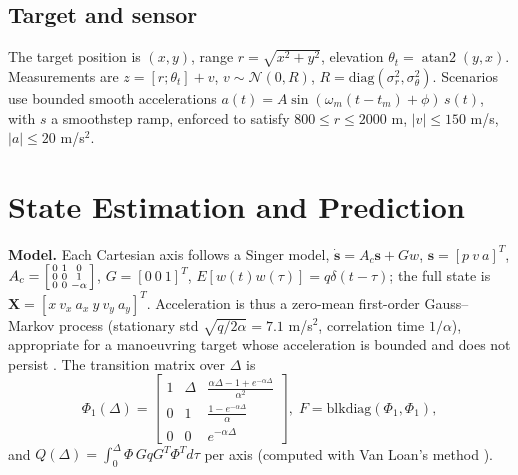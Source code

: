 \documentclass[conference]{IEEEtran}
\begin{document}
\subsection{Target and sensor}
The target position is $(x,y)$, range $r=\sqrt{x^2+y^2}$, elevation $\theta_t=\operatorname{atan2}(y,x)$. Measurements are $z=[r;\theta_t]+v$, $v\sim\mathcal N(0,R)$, $R=\mathrm{diag}(\sigma_r^2,\sigma_\theta^2)$. Scenarios use bounded smooth accelerations $a(t)=A\sin(\omega_m(t-t_m)+\phi)\,s(t)$, with $s$ a smoothstep ramp, enforced to satisfy $800\le r\le2000$ m, $|v|\le150$ m/s, $|a|\le20$ m/s$^2$.

\section{State Estimation and Prediction}
\textbf{Model.} Each Cartesian axis follows a Singer model, $\dot{\mathbf s}=A_c\mathbf s+G w$, $\mathbf s=[p\ v\ a]^T$, $A_c=\begin{bsmallmatrix}0&1&0\\0&0&1\\0&0&-\alpha\end{bsmallmatrix}$, $G=[0\ 0\ 1]^T$, $E[w(t)w(\tau)]=q\delta(t-\tau)$; the full state is $\mathbf X=[x\ v_x\ a_x\ y\ v_y\ a_y]^T$. Acceleration is thus a zero-mean first-order Gauss--Markov process (stationary std $\sqrt{q/2\alpha}=7.1$ m/s$^2$, correlation time $1/\alpha$), appropriate for a manoeuvring target whose acceleration is bounded and does not persist \cite{singer,li}. The transition matrix over $\Delta$ is
\begin{equation}
\Phi_1(\Delta)=\begin{bmatrix}1&\Delta&\tfrac{\alpha\Delta-1+e^{-\alpha\Delta}}{\alpha^2}\\0&1&\tfrac{1-e^{-\alpha\Delta}}{\alpha}\\0&0&e^{-\alpha\Delta}\end{bmatrix},\;F=\mathrm{blkdiag}(\Phi_1,\Phi_1),
\end{equation}
and $Q(\Delta)=\int_0^\Delta \Phi\, GqG^T\Phi^T d\tau$ per axis (computed with Van Loan's method \cite{vanloan}).
\end{document}
